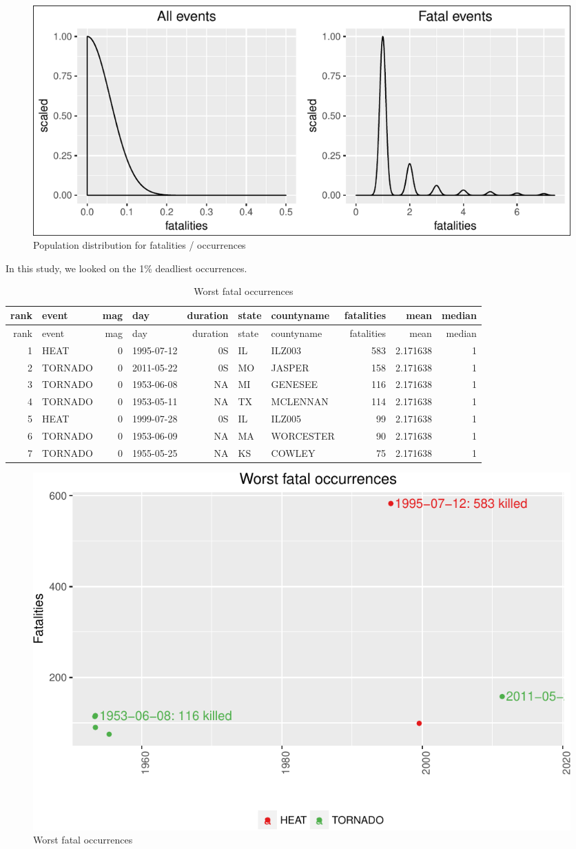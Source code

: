 \suppressfloats\begin{figure}[htbp]
\centering
\includegraphics{readme_files/figure-latex/fatal-distr-4-1.pdf}
\caption{Population distribution for fatalities / occurrences}
\end{figure}

In this study, we looked on the 1\% deadliest occurrences.

\begin{longtable}[]{@{}rlrlrllrrr@{}}
\caption{Worst fatal occurrences}\tabularnewline
\toprule
rank & event & mag & day & duration & state & countyname & fatalities &
mean & median\tabularnewline
\midrule
\endfirsthead
\toprule
rank & event & mag & day & duration & state & countyname & fatalities &
mean & median\tabularnewline
\midrule
\endhead
1 & HEAT & 0 & 1995-07-12 & 0S & IL & ILZ003 & 583 & 2.171638 &
1\tabularnewline
2 & TORNADO & 0 & 2011-05-22 & 0S & MO & JASPER & 158 & 2.171638 &
1\tabularnewline
3 & TORNADO & 0 & 1953-06-08 & NA & MI & GENESEE & 116 & 2.171638 &
1\tabularnewline
4 & TORNADO & 0 & 1953-05-11 & NA & TX & MCLENNAN & 114 & 2.171638 &
1\tabularnewline
5 & HEAT & 0 & 1999-07-28 & 0S & IL & ILZ005 & 99 & 2.171638 &
1\tabularnewline
6 & TORNADO & 0 & 1953-06-09 & NA & MA & WORCESTER & 90 & 2.171638 &
1\tabularnewline
7 & TORNADO & 0 & 1955-05-25 & NA & KS & COWLEY & 75 & 2.171638 &
1\tabularnewline
\bottomrule
\end{longtable}

\suppressfloats\begin{figure}[htbp]
\centering
\includegraphics{readme_files/figure-latex/fatal-plot-single-1.pdf}
\caption{Worst fatal occurrences}
\end{figure}


